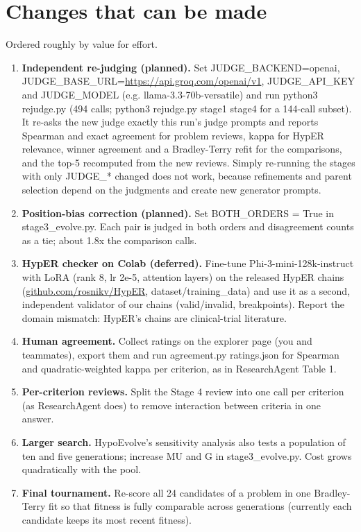\documentclass[11pt,a4paper]{article}
\begin{document}
\section{Changes that can be made}
Ordered roughly by value for effort.
\begin{enumerate}[leftmargin=1.6em]
\item \textbf{Independent re-judging (planned).} Set JUDGE\_\allowbreak{}BACKEND=openai, JUDGE\_\allowbreak{}BASE\_\allowbreak{}URL=\url{https://api.groq.com/openai/v1}, JUDGE\_\allowbreak{}API\_\allowbreak{}KEY and JUDGE\_\allowbreak{}MODEL (e.g. llama-3.3-70b-versatile) and run python3 rejudge.py (494 calls; python3 rejudge.py stage1 stage4 for a 144-call subset). It re-asks the new judge exactly this run's judge prompts and reports Spearman and exact agreement for problem reviews, kappa for HypER relevance, winner agreement and a Bradley-Terry refit for the comparisons, and the top-5 recomputed from the new reviews. Simply re-running the stages with only JUDGE\_\allowbreak{}* changed does not work, because refinements and parent selection depend on the judgments and create new generator prompts.
\item \textbf{Position-bias correction (planned).} Set BOTH\_\allowbreak{}ORDERS = True in stage3\_\allowbreak{}evolve.py. Each pair is judged in both orders and disagreement counts as a tie; about 1.8x the comparison calls.
\item \textbf{HypER checker on Colab (deferred).} Fine-tune Phi-3-mini-128k-instruct with LoRA (rank 8, lr 2e-5, attention layers) on the released HypER chains (\url{github.com/rosnikv/HypER}, dataset/training\_\allowbreak{}data) and use it as a second, independent validator of our chains (valid/invalid, breakpoints). Report the domain mismatch: HypER's chains are clinical-trial literature.
\item \textbf{Human agreement.} Collect ratings on the explorer page (you and teammates), export them and run agreement.py ratings.json for Spearman and quadratic-weighted kappa per criterion, as in ResearchAgent Table 1.
\item \textbf{Per-criterion reviews.} Split the Stage 4 review into one call per criterion (as ResearchAgent does) to remove interaction between criteria in one answer.
\item \textbf{Larger search.} HypoEvolve's sensitivity analysis also tests a population of ten and five generations; increase MU and G in stage3\_\allowbreak{}evolve.py. Cost grows quadratically with the pool.
\item \textbf{Final tournament.} Re-score all 24 candidates of a problem in one Bradley-Terry fit so that fitness is fully comparable across generations (currently each candidate keeps its most recent fitness).

\end{enumerate}
\end{document}
